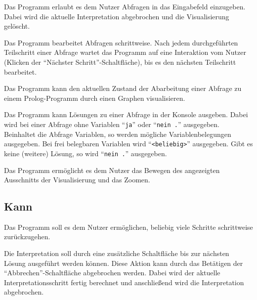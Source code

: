 \documentclass[parskip=full,11pt,twoside]{scrartcl}
\begin{document}

Das Programm erlaubt es dem Nutzer Abfragen in das Eingabefeld einzugeben. Dabei wird die aktuelle Interpretation abgebrochen und die Visualisierung gelöscht.


Das Programm bearbeitet Abfragen schrittweise. Nach jedem durchgeführten Teilschritt einer Abfrage wartet das Programm auf eine Interaktion vom Nutzer (Klicken der \enquote{Nächster Schritt}-Schaltfläche), bis es den nächsten Teilschritt bearbeitet.


Das Programm kann den aktuellen Zustand der Abarbeitung einer Abfrage zu einem Prolog-Programm durch einen Graphen visualisieren.


Das Programm kann Lösungen zu einer Abfrage in der Konsole ausgeben. Dabei wird bei einer Abfrage ohne Variablen \enquote{\texttt{ja}} oder \enquote{\texttt{nein .}} ausgegeben. Beinhaltet die Abfrage Variablen, so werden mögliche Variablenbelegungen ausgegeben. Bei frei belegbaren Variablen wird \enquote{\texttt{<beliebig>}} ausgegeben. Gibt es keine (weitere) Lösung, so wird \enquote{\texttt{nein .}} ausgegeben.


Das Programm ermöglicht es dem Nutzer das Bewegen des angezeigten Ausschnitts der Visualisierung und das Zoomen.

\subsection{Kann}


Das Programm soll es dem Nutzer ermöglichen, beliebig viele Schritte schrittweise zurückzugehen.


Die Interpretation soll durch eine zusätzliche Schaltfläche bis zur nächsten Lösung ausgeführt werden können. Diese Aktion kann durch das Betätigen der \enquote{Abbrechen}-Schaltfläche abgebrochen werden. Dabei wird der aktuelle Interpretationsschritt fertig berechnet und anschließend wird die Interpretation abgebrochen.
\end{document}
